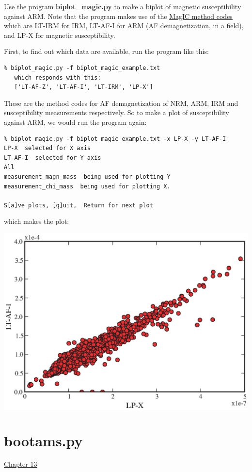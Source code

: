 \documentclass[11pt]{book}
\begin{document}
{{{{{Use the program {\bf biplot\_magic.py} to make a biplot of  magnetic susceptibility against ARM.  Note that the program makes use of the \href{#method_codes}{MagIC method codes} which are LT-IRM for IRM, LT-AF-I for ARM (AF demagnetization, in a field), and LP-X for magnetic susceptibility.  

First, to find out which data are available, run the program like this: 

\begin{verbatim}
% biplot_magic.py -f biplot_magic_example.txt
   which responds with this:
   ['LT-AF-Z', 'LT-AF-I', 'LT-IRM', 'LP-X']
   \end{verbatim}

These are the method codes for  AF demagnetization of NRM, ARM, IRM and susceptibility measurements respectively.  So to make a plot of 
susceptibility against ARM, we would run the program again:


\begin{verbatim}
% biplot_magic.py -f biplot_magic_example.txt -x LP-X -y LT-AF-I
LP-X  selected for X axis
LT-AF-I  selected for Y axis
All
measurement_magn_mass  being used for plotting Y
measurement_chi_mass  being used for plotting X.

S[a]ve plots, [q]uit,  Return for next plot 
\end{verbatim}

\noindent which makes the plot:

{\hskip 1in %
  \includegraphics[width=15 cm]{EPSfiles/arm-x.eps}}
  
  
\section {\bf bootams.py} 
\href{http://magician.ucsd.edu/Essentials/WebBook2.html#Paleomagnetic_tensors}{Chapter 13}
\label{ex:bootams}

}}}}}
\end{document}
